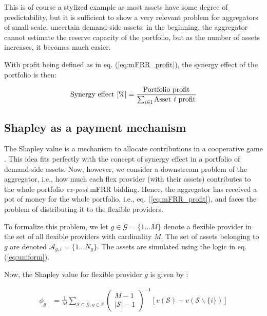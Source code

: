 \documentclass[lettersize,journal]{IEEEtran}
\begin{document}
This is of course a stylized example as most assets have some degree of predictability, but it is sufficient to show a very relevant problem for aggregators of small-scale, uncertain demand-side assets: in the beginning, the aggregator cannot estimate the reserve capacity of the portfolio, but as the number of assets increases, it becomes much easier.

With profit being defined as in eq. (\ref{eq:mFRR_profit}), the synergy effect of the portfolio is then:

\begin{align}\label{eq:synergy_effect}
    \text{Synergy effect [\%]} = \frac{ \text{Portfolio profit} }{ \sum_{i \in \mathbb{I}} \text{Asset \textit{i} profit} }
\end{align}


\subsection{Shapley as a payment mechanism}

The Shapley value is a mechanism to allocate contributions in a cooperative game \cite{shapley1997value}. This idea fits perfectly with the concept of synergy effect in a portfolio of demand-side assets. Now, however, we consider a downstream problem of the aggregator, i.e., how much each flex provider (with their assets) contributes to the whole portfolio \textit{ex-post} mFRR bidding. Hence, the aggregator has received a pot of money for the whole portfolio, i.e., eq. (\ref{eq:mFRR_profit}), and faces the problem of distributing it to the flexible providers.

To formalize this problem, we let $g \in \mathcal{G} = \{1 \hdots M \}$ denote a flexible provider in the set of all flexible providers with cardinality $M$. The set of assets belonging to $g$ are denoted $\mathcal{A}_{g,i} = \{1 \hdots N_g \}$. The assets are simulated using the logic in eq. (\ref{eq:uniform}).

Now, the Shapley value for flexible provider $g$ is given by \cite{shapley1997value}:

\begin{align}\label{eq:shap}
    \phi_g & = \frac{1}{M} \sum_{\mathcal{S} \subseteq \mathcal{G}, g \in \mathcal{S}}\left(\begin{array}{c}
                                                                                                    M-1 \\
                                                                                                    |\mathcal{S}|-1
                                                                                                \end{array}\right)^{-1}[v(\mathcal{S})-v(\mathcal{S} \backslash\{i\})]
\end{align}
\end{document}
